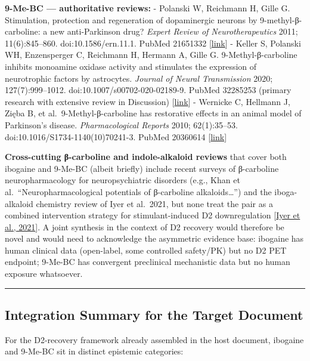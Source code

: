 \textbf{9-Me-BC --- authoritative reviews:} - Polanski W, Reichmann H, Gille G. Stimulation, protection and regeneration of dopaminergic neurons by 9-methyl-β-carboline: a new anti-Parkinson drug? \emph{Expert Review of Neurotherapeutics} 2011; 11(6):845--860. doi:10.1586/ern.11.1. PubMed 21651332 {[}\href{https://pubmed.ncbi.nlm.nih.gov/21651332/}{link}{]} - Keller S, Polanski WH, Enzensperger C, Reichmann H, Hermann A, Gille G. 9-Methyl-β-carboline inhibits monoamine oxidase activity and stimulates the expression of neurotrophic factors by astrocytes. \emph{Journal of Neural Transmission} 2020; 127(7):999--1012. doi:10.1007/s00702-020-02189-9. PubMed 32285253 (primary research with extensive review in Discussion) {[}\href{https://pmc.ncbi.nlm.nih.gov/articles/PMC8592951/}{link}{]} - Wernicke C, Hellmann J, Zięba B, et al.~9-Methyl-β-carboline has restorative effects in an animal model of Parkinson's disease. \emph{Pharmacological Reports} 2010; 62(1):35--53. doi:10.1016/S1734-1140(10)70241-3. PubMed 20360614 {[}\href{https://pubmed.ncbi.nlm.nih.gov/20360614/?dopt=Abstract}{link}{]}

\textbf{Cross-cutting β-carboline and indole-alkaloid reviews} that cover both ibogaine and 9-Me-BC (albeit briefly) include recent surveys of β-carboline neuropharmacology for neuropsychiatric disorders (e.g., Khan et al.~``Neuropharmacological potentials of β-carboline alkaloids\ldots{}'') and the iboga-alkaloid chemistry review of Iyer et al.~2021, but none treat the pair as a combined intervention strategy for stimulant-induced D2 downregulation {[}\href{https://pubmed.ncbi.nlm.nih.gov/32794540/}{Iyer et al., 2021}{]}. A joint synthesis in the context of D2 recovery would therefore be novel and would need to acknowledge the asymmetric evidence base: ibogaine has human clinical data (open-label, some controlled safety/PK) but no D2 PET endpoint; 9-Me-BC has convergent preclinical mechanistic data but no human exposure whatsoever.

\begin{center}\rule{0.5\linewidth}{0.5pt}\end{center}

\subsection{Integration Summary for the Target Document}\label{20_ibogaine-integration-summary-for-the-target-document}

For the D2-recovery framework already assembled in the host document, ibogaine and 9-Me-BC sit in distinct epistemic categories:

